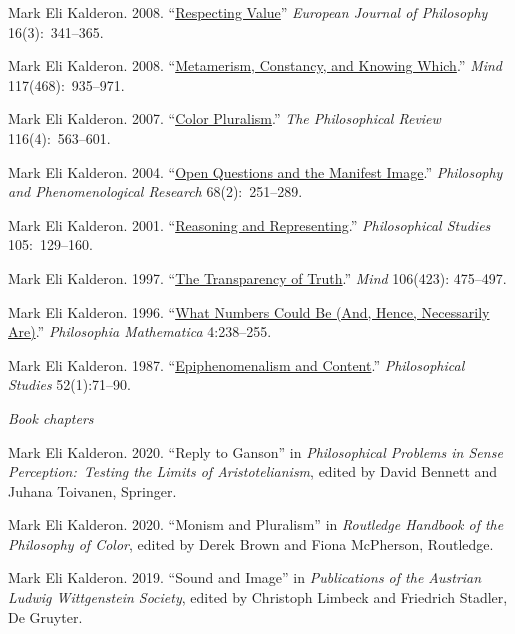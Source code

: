 \documentclass[11pt]{article}
\begin{document}
\ind Mark Eli Kalderon. 2008. ``\href{http://onlinelibrary.wiley.com/doi/10.1111/j.1468-0378.2008.00324.x/pdf}{Respecting Value}'' \emph{European Journal of Philosophy}
16(3):~341--365.


\ind  Mark Eli Kalderon. 2008.  ``\href{http://mind.oxfordjournals.org/content/117/468/935.full.pdf+html}{Metamerism, Constancy, and Knowing Which}.'' \emph{Mind} 117(468):~935--971. 

\ind  Mark Eli Kalderon. 2007.  ``\href{http://philreview.dukejournals.org/content/116/4/563.full.pdf+html}{Color Pluralism}.'' \emph{The Philosophical Review} 116(4):~563--601.

\ind  Mark Eli Kalderon. 2004.  ``\href{http://onlinelibrary.wiley.com/doi/10.1111/j.1933-1592.2004.tb00341.x/pdf}{Open Questions and the Manifest Image}.'' \emph{Philosophy and Phenomenological Research} 68(2):~251--289.

\ind  Mark Eli Kalderon. 2001.  ``\href{http://www.springerlink.com/content/u5286534982v0317/fulltext.pdf}{Reasoning and Representing}.'' \emph{Philosophical Studies} 105:~129--160.

\ind Mark Eli Kalderon. 1997.
``\href{http://mind.oxfordjournals.org/content/106/423/475.full.pdf}{The Transparency of Truth}.'' \emph{Mind} 106(423): 475--497.

\ind Mark Eli Kalderon. 1996.
``\href{http://philmat.oxfordjournals.org/content/4/3/238.full.pdf}{What Numbers Could Be (And, Hence, Necessarily Are)}.'' \emph{Philosophia Mathematica} 4:238--255.

\ind Mark Eli Kalderon. 1987.
``\href{http://www.jstor.org/stable/4319905}{Epiphenomenalism and Content}.'' \emph{Philosophical Studies} 52(1):71--90.

\bigskip

\noindent\emph{Book chapters \vspace{0.05in}}

\ind Mark Eli Kalderon. 2020. ``Reply to Ganson'' in \emph{Philosophical Problems in Sense Perception:~Testing the Limits of Aristotelianism}, edited by David Bennett and Juhana Toivanen, Springer.

\ind Mark Eli Kalderon. 2020. ``Monism and Pluralism'' in \emph{Routledge Handbook of the Philosophy of Color}, edited by Derek Brown and Fiona McPherson, Routledge.

\ind Mark Eli Kalderon. 2019. ``Sound and Image'' in \emph{Publications of the Austrian Ludwig Wittgenstein Society}, edited by Christoph Limbeck and Friedrich Stadler, De Gruyter.
\end{document}
